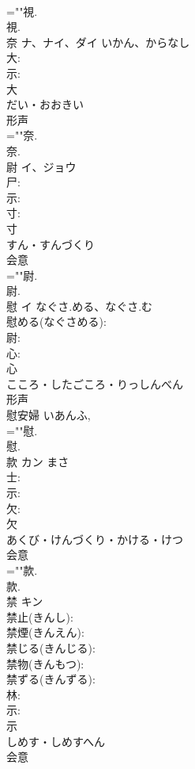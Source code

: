\documentclass[8pt]{extreport}
\begin{document}
\begin{CJK}{UTF8}{min}
\\	=""視.
\\	視.
\\	奈	ナ、ナイ、ダイ	いかん、からなし		
\\	大: 
\\	示: 
\\	大	
\\	だい・おおきい	
\\	形声 
\\	=""奈.
\\	奈.
\\	尉	イ、ジョウ			
\\	尸: 
\\	示: 
\\	寸: 
\\	寸	
\\	すん・すんづくり	
\\	会意 
\\	=""尉.
\\	尉.
\\	慰	イ	なぐさ.める、なぐさ.む		
\\	慰める(なぐさめる): 
\\	尉: 
\\	心: 
\\	心	
\\	こころ・したごころ・りっしんべん	
\\	形声 
\\	慰安婦 いあんふ, 
\\	=""慰.
\\	慰.
\\	款	カン		まさ	
\\	士: 
\\	示: 
\\	欠: 
\\	欠	
\\	あくび・けんづくり・かける・けつ	
\\	会意 
\\	=""款.
\\	款.
\\	禁	キン			
\\	禁止(きんし): 
\\	禁煙(きんえん): 
\\	禁じる(きんじる): 
\\	禁物(きんもつ): 
\\	禁ずる(きんずる): 
\\	林: 
\\	示: 
\\	示	
\\	しめす・しめすへん	
\\	会意 

\end{CJK}
\end{document}
